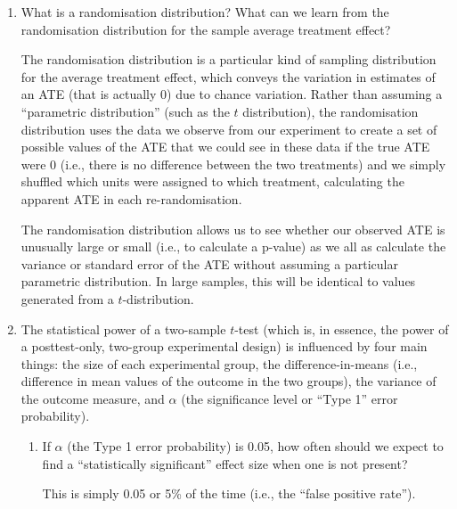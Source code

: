 \documentclass[a4paper,12pt]{exam}
\begin{document}
\begin{enumerate}
\begin{enumerate}
\end{enumerate}

\item What is a randomisation distribution? What can we learn from the randomisation distribution for the sample average treatment effect?

\begin{solution}
The randomisation distribution is a particular kind of sampling distribution for the average treatment effect, which conveys the variation in estimates of an ATE (that is actually 0) due to chance variation. Rather than assuming a ``parametric distribution'' (such as the $t$ distribution), the randomisation distribution uses the data we observe from our experiment to create a set of possible values of the ATE that we could see in these data if the true ATE were 0 (i.e., there is no difference between the two treatments) and we simply shuffled which units were assigned to which treatment, calculating the apparent ATE in each re-randomisation.

The randomisation distribution allows us to see whether our observed ATE is unusually large or small (i.e., to calculate a p-value) as we all as calculate the variance or standard error of the ATE without assuming a particular parametric distribution. In large samples, this will be identical to values generated from a $t$-distribution.
\end{solution}

\item The statistical power of a two-sample $t$-test (which is, in essence, the power of a posttest-only, two-group experimental design) is influenced by four main things: the size of each experimental group, the difference-in-means (i.e., difference in mean values of the outcome in the two groups), the variance of the outcome measure, and $\alpha$ (the significance level or ``Type 1'' error probability).

	\begin{enumerate}
	\item If $\alpha$ (the Type 1 error probability) is 0.05, how often should we expect to find a ``statistically significant'' effect size when one is not present?
	
	\begin{solution}
	
	This is simply 0.05 or 5\% of the time (i.e., the ``false positive rate'').
	
	\end{solution}
	

\end{enumerate}
\end{enumerate}
\end{document}
